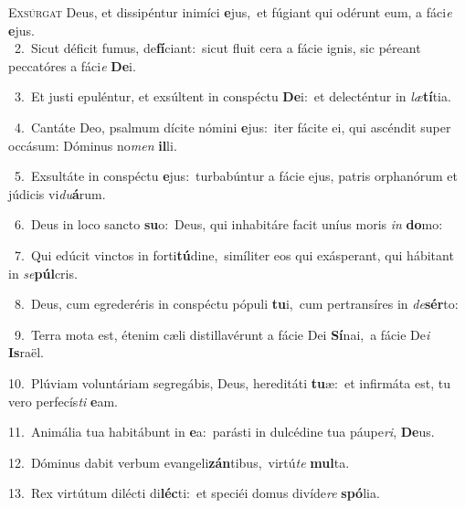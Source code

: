 \lettrine{\initial\textcolor{\initialcolor}{E}}{xsúrgat} Deus, et dissipéntur inimíci \textbf{e}\-jus,~\star et fúgiant qui odérunt eum, a fáci\textit{e} \textbf{e}\-jus.\\
{\numbfont\textcolor{\numbcolor}{~2.}}~Sicut déficit fumus, de\-\textbf{fí}\-ciant:~\star sicut fluit cera a fácie ignis, sic péreant peccatóres a fáci\textit{e} \textbf{De}\-i.\par
{\numbfont\textcolor{\numbcolor}{~3.}}~Et justi epuléntur, et exsúltent in conspéctu \textbf{De}\-i:~\star et delecténtur in \textit{læ}\-\textbf{tí}tia.\par
{\numbfont\textcolor{\numbcolor}{~4.}}~Cantáte Deo, psalmum dícite nómini \textbf{e}\-jus:~\star iter fácite ei, qui ascéndit super occásum: Dóminus no\textit{men} \textbf{il}\-li.\par
{\numbfont\textcolor{\numbcolor}{~5.}}~Exsultáte in conspéctu \textbf{e}\-jus:~\star turbabúntur a fácie ejus, patris orphanórum et júdicis vi\-\textit{du}\-\textbf{á}rum.\par
{\numbfont\textcolor{\numbcolor}{~6.}}~Deus in loco sancto \textbf{su}\-o:~\star Deus, qui inhabitáre facit uníus moris \textit{in} \textbf{do}\-mo:\par
{\numbfont\textcolor{\numbcolor}{~7.}}~Qui edúcit vinctos in forti\-\textbf{tú}\-dine,~\star simíliter eos qui exásperant, qui hábitant in \textit{se}\-\textbf{púl}cris.\par
{\numbfont\textcolor{\numbcolor}{~8.}}~Deus, cum egrederéris in conspéctu pópuli \textbf{tu}\-i,~\star cum pertransíres in \textit{de}\-\textbf{sér}to:\par
{\numbfont\textcolor{\numbcolor}{~9.}}~Terra mota est, étenim cæli distillavérunt a fácie Dei \textbf{Sí}\-nai,~\star a fácie De\textit{i} \textbf{Is}\-raël.\par
{\numbfont\textcolor{\numbcolor}{10.}}~Plúviam voluntáriam segregábis, Deus, hereditáti \textbf{tu}\-æ:~\star et infirmáta est, tu vero perfecís\textit{ti} \textbf{e}\-am.\par
{\numbfont\textcolor{\numbcolor}{11.}}~Animália tua habitábunt in \textbf{e}\-a:~\star parásti in dulcédine tua páupe\-\textit{ri}\-, \textbf{De}\-us.\par
{\numbfont\textcolor{\numbcolor}{12.}}~Dóminus dabit verbum evangeli\-\textbf{zán}\-tibus,~\star virtú\textit{te} \textbf{mul}\-ta.\par
{\numbfont\textcolor{\numbcolor}{13.}}~Rex virtútum dilécti di\-\textbf{léc}\-ti:~\star et speciéi domus divíde\textit{re} \textbf{spó}\-lia.\par
